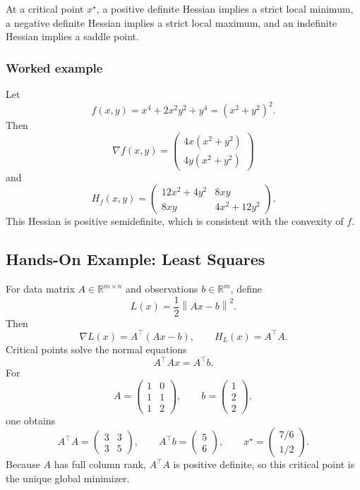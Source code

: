 \documentclass[11pt]{article}
\newcommand{\R}{\mathbb{R}}
\newcommand{\norm}[1]{\left\lVert #1\right\rVert}
\theoremstyle{definition}
\theoremstyle{plain}
\theoremstyle{remark}
\begin{document}
At a critical point $x^\star$, a positive definite Hessian implies a strict
local minimum, a negative definite Hessian implies a strict local maximum, and
an indefinite Hessian implies a saddle point.

\subsubsection*{Worked example}

Let
\[
f(x,y)=x^4+2x^2y^2+y^4=(x^2+y^2)^2.
\]
Then
\[
\nabla f(x,y)=
\begin{pmatrix}
4x(x^2+y^2)\\
4y(x^2+y^2)
\end{pmatrix}
\]
and
\[
H_f(x,y)=
\begin{pmatrix}
12x^2+4y^2&8xy\\
8xy&4x^2+12y^2
\end{pmatrix}.
\]
This Hessian is positive semidefinite, which is consistent with the convexity of
$f$.

\subsection{Hands-On Example: Least Squares}

For data matrix $A\in\R^{m\times n}$ and observations $b\in\R^m$, define
\[
L(x)=\frac12\norm{Ax-b}^2.
\]
Then
\[
\nabla L(x)=A^\top(Ax-b),
\qquad
H_L(x)=A^\top A.
\]
Critical points solve the normal equations
\[
A^\top Ax=A^\top b.
\]
For
\[
A=\begin{pmatrix}1&0\\1&1\\1&2\end{pmatrix},
\qquad
b=\begin{pmatrix}1\\2\\2\end{pmatrix},
\]
one obtains
\[
A^\top A=\begin{pmatrix}3&3\\3&5\end{pmatrix},
\qquad
A^\top b=\begin{pmatrix}5\\6\end{pmatrix},
\qquad
x^\star=\begin{pmatrix}7/6\\1/2\end{pmatrix}.
\]
Because $A$ has full column rank, $A^\top A$ is positive definite, so this
critical point is the unique global minimizer.
\end{document}
